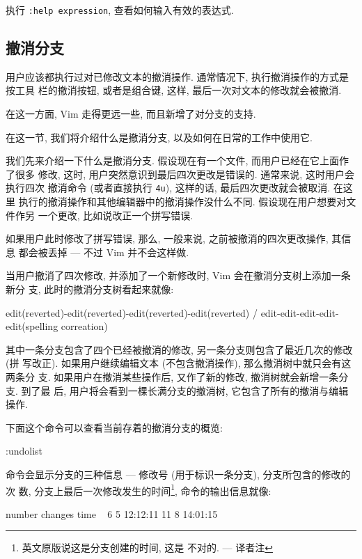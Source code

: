 \begin{warning}
    执行 \texttt{:help expression}, 查看如何输入有效的表达式.
\end{warning}

\subsection{撤消分支}
\label{subsec:using_undo_branching}

用户应该都执行过对已修改文本的撤消操作. 通常情况下, 执行撤消操作的方式是按工具
栏的撤消按钮, 或者是组合键, 这样, 最后一次对文本的修改就会被撤消.

在这一方面, Vim 走得更远一些, 而且新增了对分支的支持.

在这一节, 我们将介绍什么是撤消分支, 以及如何在日常的工作中使用它.

我们先来介绍一下什么是撤消分支. 假设现在有一个文件, 而用户已经在它上面作了很多
修改, 这时, 用户突然意识到最后四次更改是错误的. 通常来说, 这时用户会执行四次
撤消命令 (或者直接执行 \texttt{4u}), 这样的话, 最后四次更改就会被取消. 在这里
执行的撤消操作和其他编辑器中的撤消操作没什么不同. 假设现在用户想要对文件作另
一个更改, 比如说改正一个拼写错误.

如果用户此时修改了拼写错误, 那么, 一般来说, 之前被撤消的四次更改操作, 其信息
都会被丢掉 --- 不过 Vim 并不会这样做.

当用户撤消了四次修改, 并添加了一个新修改时, Vim 会在撤消分支树上添加一条新分
支, 此时的撤消分支树看起来就像:
\begin{vimcode}
                 edit(reverted)-edit(reverted)-edit(reverted)-edit(reverted)
                 /
edit-edit-edit-edit-edit(spelling correation)
\end{vimcode}

其中一条分支包含了四个已经被撤消的修改, 另一条分支则包含了最近几次的修改 (拼
写改正). 如果用户继续编辑文本 (不包含撤消操作), 那么撤消树中就只会有这两条分
支. 如果用户在撤消某些操作后, 又作了新的修改, 撤消树就会新增一条分支. 到了最
后, 用户将会看到一棵长满分支的撤消树, 它包含了所有的撤消与编辑操作.

下面这个命令可以查看当前存着的撤消分支的概览:
\begin{vimcode}
:undolist
\end{vimcode}
命令会显示分支的三种信息 --- 修改号 (用于标识一条分支), 分支所包含的修改的次
数, 分支上最后一次修改发生的时间\footnote{英文原版说这是分支创建的时间, 这是
不对的. --- 译者注}, 命令的输出信息就像:
\begin{vimcode}
number  changes time ~
6       5       12:12:11
11      8       14:01:15
\end{vimcode}

